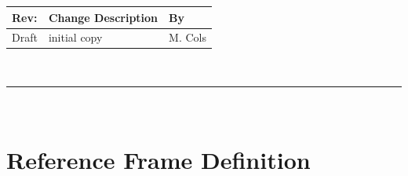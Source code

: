 \documentclass[]{AVSSimReportMemo}
\begin{document}
\makeCover


%
%
\pagestyle{empty}
{\renewcommand{\arraystretch}{2}
\noindent
\begin{longtable}{|p{0.5in}|p{4.5in}|p{1.14in}|}
\hline
{\bfseries Rev}: & {\bfseries Change Description} & {\bfseries By} \\
\hline
Draft & initial copy & M. Cols \\
\hline

\end{longtable}
}

\newpage
\setcounter{page}{1}
\pagestyle{fancy}

\tableofcontents
~\\ \hrule ~\\

\section{Reference Frame Definition}
\end{document}
